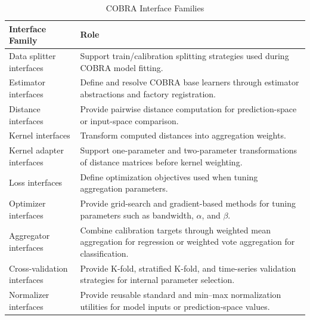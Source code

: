 \begin{table}[H]
      \centering
      \caption{COBRA Interface Families}
      \label{tab:cobra_interface_families}
      \renewcommand{\arraystretch}{1.2}
      \begin{tabularx}{\textwidth}{
                  >{\raggedright\arraybackslash}p{5cm}
                  >{\raggedright\arraybackslash}X
            }
            \toprule
            \textbf{Interface Family}   & \textbf{Role}                                                                                   \\
            \midrule
            Data splitter interfaces    &
            Support train/calibration splitting strategies used during COBRA model fitting.                                               \\

            Estimator interfaces        &
            Define and resolve COBRA base learners through estimator abstractions and factory registration.                               \\

            Distance interfaces         &
            Provide pairwise distance computation for prediction-space or input-space comparison.                                         \\

            Kernel interfaces           &
            Transform computed distances into aggregation weights.                                                                        \\

            Kernel adapter interfaces   &
            Support one-parameter and two-parameter transformations of distance matrices before kernel weighting.                         \\

            Loss interfaces             &
            Define optimization objectives used when tuning aggregation parameters.                                                       \\

            Optimizer interfaces        &
            Provide grid-search and gradient-based methods for tuning parameters such as bandwidth, $\alpha$, and $\beta$.                \\

            Aggregator interfaces       &
            Combine calibration targets through weighted mean aggregation for regression or weighted vote aggregation for classification. \\

            Cross-validation interfaces &
            Provide K-fold, stratified K-fold, and time-series validation strategies for internal parameter selection.                    \\

            Normalizer interfaces       &
            Provide reusable standard and min--max normalization utilities for model inputs or prediction-space values.                   \\
            \bottomrule
      \end{tabularx}
\end{table}

